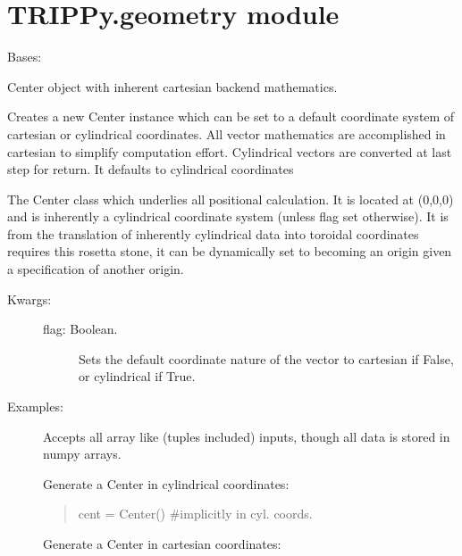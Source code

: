 \documentclass[letterpaper,10pt,english]{sphinxmanual}
\begin{document}
\chapter{TRIPPy.geometry module}
\label{TRIPPy:trippy-geometry-module}\label{TRIPPy:module-TRIPPy.geometry}

\begin{fulllineitems}
\label{TRIPPy:TRIPPy.geometry.Center}
Bases: {\hyperref[TRIPPy:TRIPPy.geometry.Origin]{}}

Center object with inherent cartesian backend mathematics.

Creates a new Center instance which can be set to a default 
coordinate system of cartesian or cylindrical coordinates.
All vector mathematics are accomplished in cartesian to 
simplify computation effort. Cylindrical vectors are
converted at last step for return.  It defaults to cylindrical
coordinates

The Center class which underlies all positional calculation.
It is located at (0,0,0) and is inherently a cylindrical coordinate
system (unless flag set otherwise). It is from the translation
of inherently cylindrical data into toroidal coordinates 
requires this rosetta stone, it can be dynamically set to 
becoming an origin given a specification of another origin.
\begin{description}
\item[{Kwargs:}] \leavevmode\begin{description}
\item[{flag: Boolean.}] \leavevmode
Sets the default coordinate nature of the vector to 
cartesian if False, or cylindrical if True.

\end{description}

\item[{Examples:   }] \leavevmode
Accepts all array like (tuples included) inputs, though all data 
is stored in numpy arrays.

Generate a Center in cylindrical coordinates:
\begin{quote}

cent = Center() \#implicitly in cyl. coords.
\end{quote}

Generate a Center in cartesian coordinates:
\begin{quote}


\end{quote}
\end{description}
\end{fulllineitems}
\end{document}
